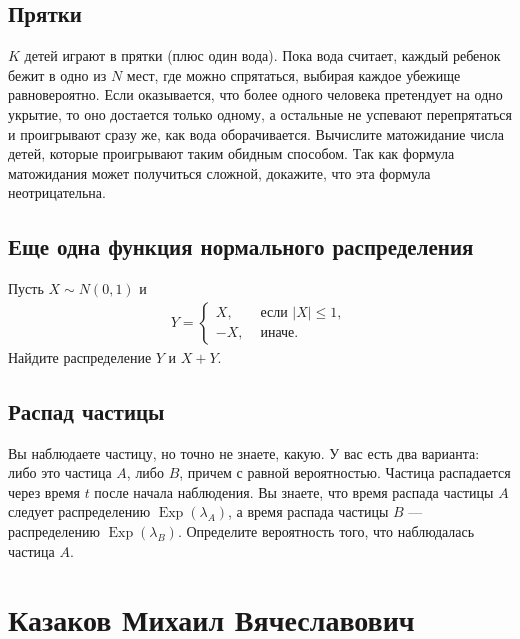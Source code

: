 \documentclass[12pt]{article}
\DeclareMathOperator{\Exp}{Exp}
\begin{document}
\subsection{Прятки}
$K$ детей играют в прятки (плюс один вода). Пока вода считает, каждый ребенок бежит в одно из $N$ мест, где можно спрятаться, выбирая каждое убежище равновероятно. Если оказывается, что более одного человека претендует на одно укрытие, то оно достается только одному, а остальные не успевают перепрятаться и проигрывают сразу же, как вода оборачивается. Вычислите матожидание числа детей, которые проигрывают таким обидным способом. Так как формула матожидания может получиться сложной, докажите, что эта формула неотрицательна.

\subsection{Еще одна функция нормального распределения}
Пусть $X \sim N(0, 1)$ и 
\begin{align*}
    Y = \begin{cases}
        X, &\text{ если } |X| \le 1, \\
        -X, &\text{ иначе.}
    \end{cases}
\end{align*}
Найдите распределение $Y$ и $X + Y$.

\subsection{Распад частицы}
Вы наблюдаете частицу, но точно не знаете, какую. У вас есть два варианта: либо это частица $A$, либо $B$, причем с равной вероятностью. Частица распадается через время $t$ после начала наблюдения. Вы знаете, что время распада частицы $A$ следует распределению $\Exp(\lambda_A)$, а время распада частицы $B$ --- распределению $\Exp(\lambda_B)$. Определите вероятность того, что наблюдалась частица $A$.

\newpage
\section{Казаков Михаил Вячеславович}
\end{document}
